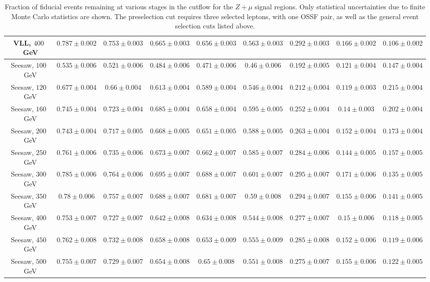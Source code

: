 \begin{table}[ht]
{\begin{tabular}{|c|c|c|c|c|c||c|c|c|}
		\hline
		VLL, $400$~GeV	&	$0.787 \pm 0.002$	&	$0.753 \pm 0.003$	&	$0.665 \pm 0.003$	&	$0.656 \pm 0.003$	&	$0.563 \pm 0.003$	&	$0.292 \pm 0.003$ &	$0.166 \pm 0.002$	&	$0.106 \pm 0.002$\\
		\hline
		Seesaw, $100$~GeV	&	$0.535 \pm 0.006$	&	$0.521 \pm 0.006$	&	$0.484 \pm 0.006$	&	$0.471 \pm 0.006$	&	$0.46 \pm 0.006$	&	$0.192 \pm 0.005$ &	$0.121 \pm 0.004$	&	$0.147 \pm 0.004$\\
		\hline
		Seesaw, $120$~GeV	&	$0.677 \pm 0.004$	&	$0.66 \pm 0.004$	&	$0.613 \pm 0.004$	&	$0.589 \pm 0.004$	&	$0.546 \pm 0.004$	&	$0.212 \pm 0.004$ &	$0.119 \pm 0.003$	&	$0.215 \pm 0.004$\\
		\hline
		Seesaw, $160$~GeV	&	$0.745 \pm 0.004$	&	$0.723 \pm 0.004$	&	$0.685 \pm 0.004$	&	$0.658 \pm 0.004$	&	$0.595 \pm 0.005$	&	$0.252 \pm 0.004$ &	$0.14 \pm 0.003$	&	$0.202 \pm 0.004$\\
		\hline
		Seesaw, $200$~GeV	&	$0.743 \pm 0.004$	&	$0.717 \pm 0.005$	&	$0.668 \pm 0.005$	&	$0.651 \pm 0.005$	&	$0.588 \pm 0.005$	&	$0.263 \pm 0.004$ &	$0.152 \pm 0.004$	&	$0.173 \pm 0.004$\\
		\hline
		Seesaw, $250$~GeV	&	$0.761 \pm 0.006$	&	$0.735 \pm 0.006$	&	$0.673 \pm 0.007$	&	$0.662 \pm 0.007$	&	$0.585 \pm 0.007$	&	$0.284 \pm 0.006$ &	$0.144 \pm 0.005$	&	$0.157 \pm 0.005$\\
		\hline
		Seesaw, $300$~GeV	&	$0.785 \pm 0.006$	&	$0.764 \pm 0.006$	&	$0.695 \pm 0.007$	&	$0.688 \pm 0.007$	&	$0.601 \pm 0.007$	&	$0.295 \pm 0.007$ &	$0.171 \pm 0.006$	&	$0.135 \pm 0.005$\\
		\hline
		Seesaw, $350$~GeV	&	$0.78 \pm 0.006$	&	$0.757 \pm 0.007$	&	$0.688 \pm 0.007$	&	$0.681 \pm 0.007$	&	$0.59 \pm 0.008$	&	$0.294 \pm 0.007$ &	$0.155 \pm 0.006$	&	$0.141 \pm 0.005$\\
		\hline
		Seesaw, $400$~GeV	&	$0.753 \pm 0.007$	&	$0.727 \pm 0.007$	&	$0.642 \pm 0.008$	&	$0.634 \pm 0.008$	&	$0.544 \pm 0.008$	&	$0.277 \pm 0.007$ &	$0.15 \pm 0.006$	&	$0.118 \pm 0.005$\\
		\hline
		Seesaw, $450$~GeV	&	$0.762 \pm 0.008$	&	$0.732 \pm 0.008$	&	$0.658 \pm 0.008$	&	$0.653 \pm 0.009$	&	$0.555 \pm 0.009$	&	$0.285 \pm 0.008$ &	$0.152 \pm 0.006$	&	$0.119 \pm 0.006$\\
		\hline
		Seesaw, $500$~GeV	&	$0.755 \pm 0.007$	&	$0.729 \pm 0.007$	&	$0.654 \pm 0.008$	&	$0.65 \pm 0.008$	&	$0.551 \pm 0.008$	&	$0.275 \pm 0.007$ &	$0.155 \pm 0.006$	&	$0.122 \pm 0.005$\\
		\hline
	\end{tabular}
	}
	\caption{Fraction of fiducial events remaining at various stages in the cutflow for the $Z+\mu$ signal regions. Only statistical uncertainties due to finite Monte Carlo statistics are shown. The preselection cut requires three selected leptons, with one OSSF pair, as well as the general event selection cuts listed above.}
	\label{table:fiducial-efficiencies-Zmu}
\end{table}


